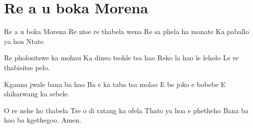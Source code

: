 \starttocol
\chapter{Re a u boka Morena }
\nexttocol
\hfill{\it }
\stoptocol
\starttocol
\startlines
{\sc Re a} u boka Morena 
Re ntse re thabela wena
Re sa phela ha monate 
Ka paballo ya hoa Ntate.

Re pholositswe ka mohau
Ka dineo tsohle tsa hao
Reko la hao le leholo 
Le re thabisitse pelo.

Kganna jwale bana ba hao
Ba e ka taba tsa molao
E be joko e bobebe 
E shikarwang ka sebele. 

O re nehe ho thabela 
Tse o di ratang ka ofela 
Thato ya hoa e phetheho 
Bana ba hao ba kgethegoo.
       \hfill Amen.~~~~~~~~~
\stoplines
\nexttocol

\stoptocol
